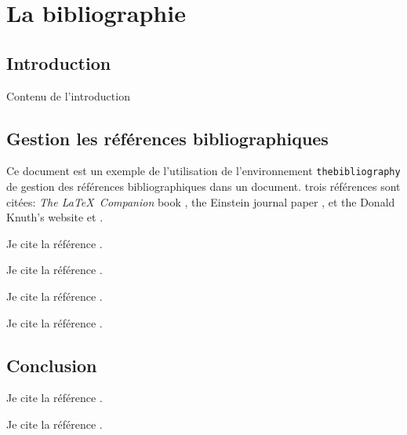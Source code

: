 \chapter{La bibliographie}


\section{Introduction}
Contenu de l'introduction

\section{Gestion les références bibliographiques}
 
Ce document est un exemple de l'utilisation de l'environnement \texttt{thebibliography} de gestion des références bibliographiques dans un document. trois références sont citées: \textit{The \LaTeX\ Companion} 
book \cite{Johnson}, the Einstein journal paper \cite{Zoran}, et the 
Donald Knuth's website \cite{late} et \cite{texb}. 

Je cite la référence \cite{Laverdure1983}. 

Je cite la référence \cite{Agusti2003}. 

Je cite la référence \cite{Yamada2005}. 


Je cite la référence \cite{ref3}. 



\section{Conclusion}


Je cite la référence \cite{ref4}. 



Je cite la référence \cite{WinNT}. 





